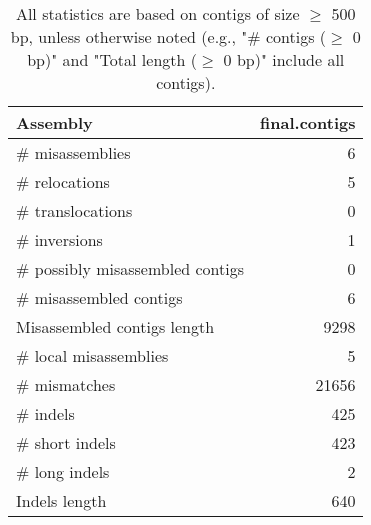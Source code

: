 \documentclass[12pt,a4paper]{article}
\begin{document}
\begin{table}[ht]
\begin{center}
\caption{All statistics are based on contigs of size $\geq$ 500 bp, unless otherwise noted (e.g., "\# contigs ($\geq$ 0 bp)" and "Total length ($\geq$ 0 bp)" include all contigs).}
\begin{tabular}{|l*{1}{|r}|}
\hline
Assembly & final.contigs \\ \hline
\# misassemblies & 6 \\ \hline
\hspace{5mm}\# relocations & 5 \\ \hline
\hspace{5mm}\# translocations & 0 \\ \hline
\hspace{5mm}\# inversions & 1 \\ \hline
\# possibly misassembled contigs & 0 \\ \hline
\# misassembled contigs & 6 \\ \hline
Misassembled contigs length & 9298 \\ \hline
\# local misassemblies & 5 \\ \hline
\# mismatches & 21656 \\ \hline
\# indels & 425 \\ \hline
\hspace{5mm}\# short indels & 423 \\ \hline
\hspace{5mm}\# long indels & 2 \\ \hline
Indels length & 640 \\ \hline
\end{tabular}
\end{center}
\end{table}
\end{document}
